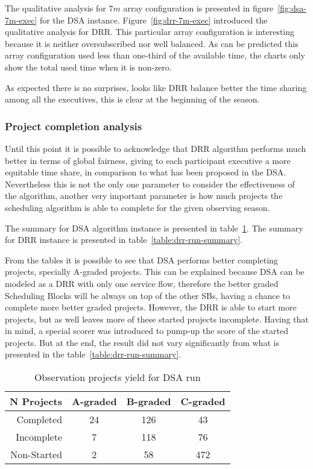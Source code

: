 The qualitative analysis for $7m$ array configuration is presented in figure~\ref{fig:dsa-7m-exec} for the DSA instance. Figure~\ref{fig:drr-7m-exec} introduced the qualitative analysis for DRR. This particular array configuration is interesting because it is neither oversubscribed nor well balanced. As can be predicted this array configuration used less than one-third of the available time, the charts only show the total used time when it is non-zero.

As expected there is no surprises, looks like DRR balance better the time sharing among all the executives, this is clear at the beginning of the season. 

\subsubsection{Project completion analysis}

Until this point it is possible to acknowledge that DRR algorithm performs much better in terms of global fairness, giving to each participant executive a more equitable time share, in comparison to what has been proposed in the DSA. Nevertheless this is not the only one parameter to consider the effectiveness of the algorithm, another very important parameter is how much projects the scheduling algorithm is able to complete for the given observing season.

The summary for DSA algorithm instance is presented in table~\ref{table:dsa-run-summary}. The summary for DRR instance is presented in table~\ref{table:drr-run-summary}.

From the tables it is possible to see that DSA performs better completing projects, specially A-graded projects. This can be explained because DSA can be modeled as a DRR with only one service flow, therefore the better graded Scheduling Blocks will be always on top of the other SBs, having a chance to complete more better graded projects. However, the DRR is able to start more projects, but as well leaves more of these started projects incomplete. Having that in mind, a special scorer was introduced to pump-up the score of the started projects. But at the end, the result did not vary significantly from what is presented in the table~\ref{table:drr-run-summary}.

\begin{table}[t!]
\centering
\begin{tabular}{|r|c|c|c|} \hline
 N Projects & A-graded & B-graded & C-graded \\ \hline
 Completed & 24 & 126 & 43 \\ \hline
 Incomplete & 7 & 118 & 76 \\ \hline
 Non-Started & 2 & 58 & 472 \\ \hline
\end{tabular}
\caption{Observation projects yield for DSA run}
\label{table:dsa-run-summary}
\end{table}

